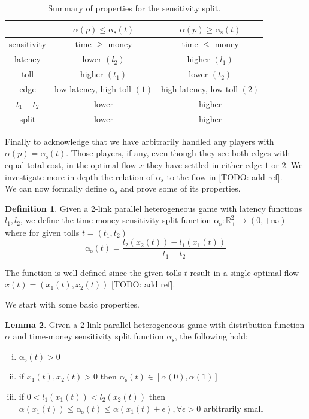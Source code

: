\documentclass[10pt,a4paper]{book}
\newcommand{\as}{\mathrm{\alpha_s}}
\newcommand{\R}{\mathbb{R}}
\theoremstyle{definition}
\newtheorem{definition}{Definition}[chapter]
\newtheorem{lemma}[definition]{Lemma}
\theoremstyle{comment}
\begin{document}
\begin{table}[h!]
	\centering
	\caption{Summary of properties for the sensitivity split.}
	\begin{tabular}{| c || c | c |}
		\hline
		& $\alpha(p) \le \as(t)$ & $\alpha(p) \ge \as(t)$ \\ \hline
		sensitivity & time $\ge$ money & time $\le$ money \\ \hline
		latency & lower $(l_2)$ & higher $(l_1)$ \\ \hline
		toll & higher $(t_1)$ & lower $(t_2)$ \\ \hline
		edge & low-latency, high-toll $(1)$ & high-latency, low-toll $(2)$ \\ \hline
		$t_1 - t_2$ & lower & higher \\ \hline
		split & lower & higher \\ \hline
	\end{tabular}
	\label{table:split_summary}
\end{table}

Finally to acknowledge that we have arbitrarily handled any players with $\alpha(p) = \as(t)$.
Those players, if any, even though they see both edges with equal total cost, in the optimal flow $x$ they have settled in either edge $1$ or $2$.
We investigate more in depth the relation of $\as$ to the flow in [TODO: add ref].
\\[12pt]
We can now formally define $\as$ and prove some of its properties.
\begin{definition}
	Given a 2-link parallel heterogeneous game with latency functions $l_1, l_2$, we define the time-money sensitivity split function $\as: \R^2_+ \rightarrow (0, +\infty)$ where for given tolls $t = (t_1, t_2)$
	\[\as(t) = \frac{l_2(x_2(t)) - l_1(x_1(t))}{t_1 - t_2}\]
\end{definition}
The function is well defined since the given tolls $t$ result in a single optimal flow $x(t) = (x_1(t), x_2(t))$ [TODO: add ref].

We start with some basic properties.
\begin{lemma}
	\label{lemma:split_basic}
	Given a 2-link parallel heterogeneous game with distribution function $\alpha$ and time-money sensitivity split function $\as$, the following hold:
	\begin{enumerate}[(i)]
		\item $\as(t) > 0$
		\item if $x_1(t), x_2(t) > 0$ then $\as(t) \in [\alpha(0), \alpha(1)]$
		\item if $0 < l_1(x_1(t)) < l_2(x_2(t))$ then $\alpha(x_1(t)) \le \as(t) \le \alpha(x_1(t) + \epsilon), \forall \epsilon > 0$ arbitrarily small
	\end{enumerate}
\end{lemma}
\end{document}
